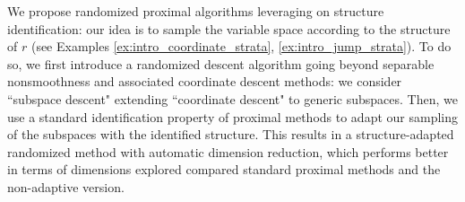 



We propose randomized proximal algorithms leveraging on structure identification: our idea is to sample the variable space according to the structure of $r$ (see Examples \ref{ex:intro_coordinate_strata}, \ref{ex:intro_jump_strata}). To do so, we first introduce a randomized descent algorithm going beyond separable nonsmoothness and associated coordinate descent methods:
we consider ``subspace descent" extending ``coordinate descent" to generic subspaces.
Then, we use a standard identification property of proximal methods to adapt our sampling of the subspaces with the identified structure. This results in a structure-adapted randomized method with automatic dimension reduction, which 
performs better in terms of dimensions explored compared standard proximal methods and the non-adaptive version.

